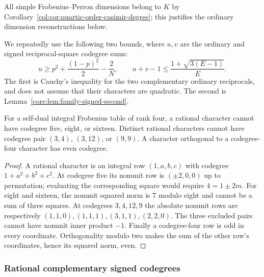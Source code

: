 All simple Frobenius--Perron dimensions belong to $K$ by
Corollary~\ref{col:cor:quartic-order-casimir-degree}; this justifies
the ordinary dimension reconstructions below.

We repeatedly use the following two bounds, where $u,v$ are the ordinary
and signed reciprocal-square codegree sums:
\begin{equation}\label{qs:moments}
 u\ge p^2+\frac{(1-p)^2}{2}-\frac2N,
 \qquad u+v-1\le\frac{1+\sqrt{3(E-1)}}E.
\end{equation}
The first is Cauchy's inequality for the two complementary ordinary
reciprocals, and does not assume that their characters are quadratic.
The second is Lemma~\ref{core:lem:family-signed-second}.

\begin{lemma}\label{quad:lem:small-rows}
For a self-dual integral Frobenius table of rank four, a rational
character cannot have codegree five, eight, or sixteen. Distinct
rational characters cannot have codegree pair $(3,4)$, $(3,12)$,
or $(9,9)$. A character orthogonal to a codegree-four character
has even codegree.
\end{lemma}
\begin{proof}
A rational character is an integral row $(1,a,b,c)$ with codegree
$1+a^2+b^2+c^2$. At codegree five its nonunit row is $(\pm2,0,0)$
up to permutation; evaluating the corresponding square would require
$4=1\pm2m$. For eight and sixteen, the nonunit squared norm is
$7$ modulo eight and cannot be a sum of three squares.
At codegrees $3,4,12,9$ the absolute nonunit rows are respectively
$(1,1,0),(1,1,1),(3,1,1),(2,2,0)$. The three excluded pairs cannot
have nonunit inner product $-1$. Finally a codegree-four row is odd
in every coordinate. Orthogonality modulo two makes the sum of the
other row's coordinates, hence its squared norm, even.
\end{proof}

\subsubsection{Rational complementary signed codegrees}


